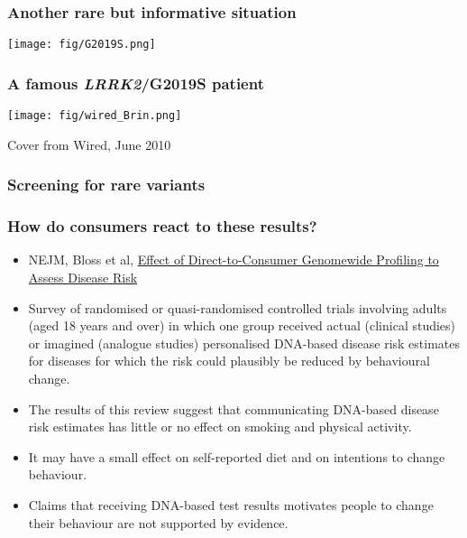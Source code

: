 \documentclass{beamer}
\begin{document}
\begin{frame}
  \frametitle{Another rare but informative situation}
  \begin{center} 
    \texttt{[image: fig/G2019S.png]}
  \end{center}
\end{frame}


\begin{frame}
  \frametitle{A famous {\it LRRK2}/G2019S patient}
  \begin{center} 
    \texttt{[image: fig/wired\_Brin.png]}
  \end{center}
  Cover from Wired, June 2010
\end{frame}


\begin{frame}
  \frametitle{Screening for rare variants}
  \begin{center}
  \end{center}
\end{frame}





\begin{frame}
  \frametitle{How do consumers react to these results?}
  \begin{itemize}
  \item NEJM, Bloss et al, \href{http://www.nejm.org/doi/full/10.1056/NEJMoa1011893}{Effect of Direct-to-Consumer Genomewide Profiling to Assess Disease Risk}
    \item Survey of randomised or quasi-randomised controlled trials involving adults (aged 18 years and over) in which one group received actual (clinical studies) or imagined (analogue studies) personalised DNA-based disease risk estimates for diseases for which the risk could plausibly be reduced by behavioural change.
  \item The results of this review suggest that communicating DNA-based disease risk estimates has little or no effect on smoking and physical activity.
  \item It may have a small effect on self-reported diet and on intentions to change behaviour. 
  \item Claims that receiving DNA-based test results motivates people to change their behaviour are not supported by evidence. 
  \end{itemize}
\end{frame}
\end{document}
